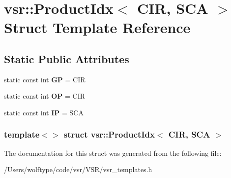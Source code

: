 \hypertarget{structvsr_1_1_product_idx_3_01_c_i_r_00_01_s_c_a_01_4}{\section{vsr\-:\-:Product\-Idx$<$ C\-I\-R, S\-C\-A $>$ Struct Template Reference}
\label{structvsr_1_1_product_idx_3_01_c_i_r_00_01_s_c_a_01_4}
}
\subsection*{Static Public Attributes}
\begin{DoxyCompactItemize}
\item 
\hypertarget{structvsr_1_1_product_idx_3_01_c_i_r_00_01_s_c_a_01_4_ab4644b0beec9accd1034510ac0053c80}{static const int {\bfseries G\-P} = C\-I\-R}\label{structvsr_1_1_product_idx_3_01_c_i_r_00_01_s_c_a_01_4_ab4644b0beec9accd1034510ac0053c80}

\item 
\hypertarget{structvsr_1_1_product_idx_3_01_c_i_r_00_01_s_c_a_01_4_a54f1389b19fca262359b4ecce3478126}{static const int {\bfseries O\-P} = C\-I\-R}\label{structvsr_1_1_product_idx_3_01_c_i_r_00_01_s_c_a_01_4_a54f1389b19fca262359b4ecce3478126}

\item 
\hypertarget{structvsr_1_1_product_idx_3_01_c_i_r_00_01_s_c_a_01_4_a378820f2b430865fd60c33ec0ced7643}{static const int {\bfseries I\-P} = S\-C\-A}\label{structvsr_1_1_product_idx_3_01_c_i_r_00_01_s_c_a_01_4_a378820f2b430865fd60c33ec0ced7643}

\end{DoxyCompactItemize}
\subsubsection*{template$<$$>$ struct vsr\-::\-Product\-Idx$<$ C\-I\-R, S\-C\-A $>$}



The documentation for this struct was generated from the following file\-:\begin{DoxyCompactItemize}
\item 
/\-Users/wolftype/code/vsr/\-V\-S\-R/vsr\-\_\-templates.\-h\end{DoxyCompactItemize}
